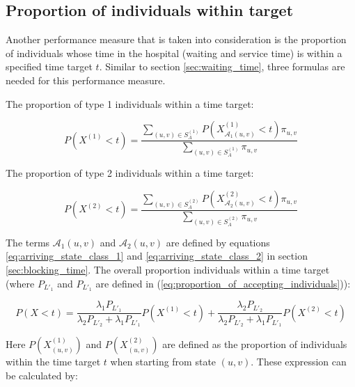 \subsection{Proportion of individuals within target}\label{sec:proportion_within_target}

Another performance measure that is taken into consideration is the proportion 
of individuals whose time in the hospital (waiting and service time) is within
a specified time target \(t\).
Similar to section \ref{sec:waiting_time}, three formulas are needed for this 
performance measure.

The proportion of type 1 individuals within a time target:

\begin{equation}\label{eq:proportion_within_target_type_1}
    P(X^{(1)} < t) = \frac{\sum_{(u,v) \in S_A^{(1)}} 
    P(X_{\mathcal{A}_1(u,v)}^{(1)} < t) 
    \pi_{u,v} }{\sum_{(u,v) \in S_A^{(1)}} \pi_{u,v}}
\end{equation}

The proportion of type 2 individuals within a time target:

\begin{equation}\label{eq:proportion_within_target_type_2}
    P(X^{(2)} < t) = \frac{\sum_{(u,v) \in S_A^{(2)}} 
    P(X_{\mathcal{A}_2(u,v)}^{(2)} < t) 
    \pi_{u,v} }{\sum_{(u,v) \in S_A^{(2)}} \pi_{u,v}}
\end{equation}

The terms \(\mathcal{A}_1(u,v)\) and \(\mathcal{A}_2(u,v)\) are defined by
equations \ref{eq:arriving_state_class_1} and \ref{eq:arriving_state_class_2}
in section \ref{sec:blocking_time}.
The overall proportion individuals within a time target (where \(P_{L'_1}\) and 
\(P_{L'_1}\) are defined in (\ref{eq:proportion_of_accepting_individuals})):

\begin{equation}\label{eq:overall_proportion_within_target}
    P(X < t) = \frac{\lambda_1 P_{L'_1}}{\lambda_2 P_{L'_2}+\lambda_1 P_{L'_1}} 
    P(X^{(1)} < t) + \frac{\lambda_2 P_{L'_2}}{\lambda_2 P_{L'_2} + 
    \lambda_1 P_{L'_1}} P(X^{(2)} < t) 
\end{equation}

Here \(P(X_{(u,v)}^{(1)})\) and \(P(X_{(u,v)}^{(2)})\) are defined as the
proportion of individuals within the time target \(t\) when starting from state 
\((u,v)\).
These expression can be calculated by:

